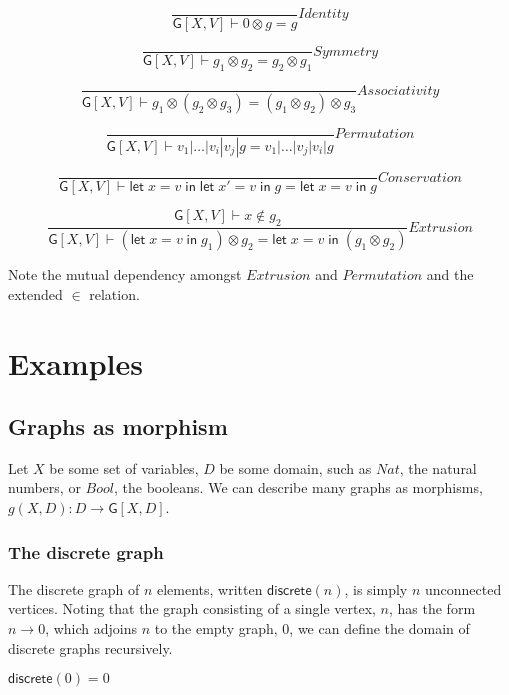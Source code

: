 \documentclass[12pt]{llncs}
\begin{document}
\[\frac{ }{ \mathsf{G}[X,V] \vdash 0 \otimes g = g}Identity\]

\[\frac{ }{ \mathsf{G}[X,V] \vdash g_1 \otimes g_2 = g_2 \otimes g_1}Symmetry\]

\[\frac{ }{ \mathsf{G}[X,V] \vdash g_1 \otimes ( g_2 \otimes g_3 ) = ( g_1 \otimes g_2) \otimes g_3}Associativity\]

\[\frac{ }{ \mathsf{G}[X,V] \vdash v_1|\ldots|v_i|v_j|g = v_1|\ldots|v_j|v_i|g}Permutation\]

\[\frac{ }{ \mathsf{G}[X,V] \vdash \mathsf{let}\; x = v \; \mathsf{in}\; \mathsf{let}\; x' = v \; \mathsf{in}\; g = \mathsf{let}\; x = v \; \mathsf{in}\; g}Conservation\]

\[\frac{ \mathsf{G}[X,V] \vdash x \notin g_2}{ \mathsf{G}[X,V] \vdash (\mathsf{let}\; x = v \; \mathsf{in}\; g_1) \otimes g_2 = \mathsf{let}\; x = v \; \mathsf{in}\; ( g_1 \otimes g_2)}Extrusion\]

Note the mutual dependency amongst \(Extrusion\) and \(Permutation\) and
the extended \(\in\) relation.

\hypertarget{examples}{%
\section{Examples}\label{examples}}

\hypertarget{graphs-as-morphism}{%
\subsection{Graphs as morphism}\label{graphs-as-morphism}}

Let \(X\) be some set of variables, \(D\) be some domain, such as
\(Nat\), the natural numbers, or \(Bool\), the booleans. We can describe
many graphs as morphisms, \(g(X,D): D \to \mathsf{G}[X,D]\).

\hypertarget{the-discrete-graph}{%
\subsubsection{The discrete graph}\label{the-discrete-graph}}

The discrete graph of \(n\) elements, written \(\mathsf{discrete}(n)\),
is simply \(n\) unconnected vertices. Noting that the graph consisting
of a single vertex, \(n\), has the form \(n \to 0\), which adjoins \(n\)
to the empty graph, \(0\), we can define the domain of discrete graphs
recursively.

\(\mathsf{discrete}(0) = 0\)
\end{document}
